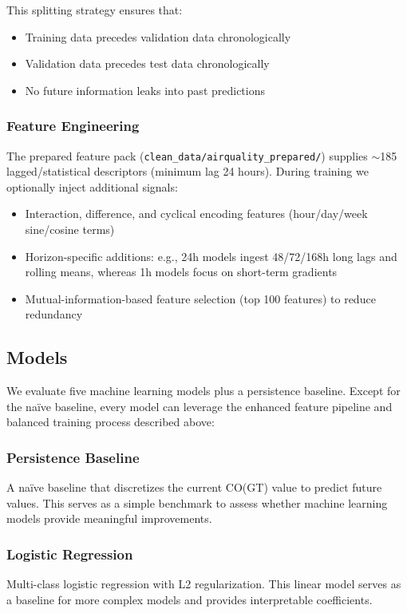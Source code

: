 \documentclass[12pt,a4paper]{article}
\begin{document}
This splitting strategy ensures that:
\begin{itemize}
    \item Training data precedes validation data chronologically
    \item Validation data precedes test data chronologically
    \item No future information leaks into past predictions
\end{itemize}

\subsubsection{Feature Engineering}
The prepared feature pack (\texttt{clean\_data/airquality\_prepared/}) supplies $\sim$185 lagged/statistical descriptors (minimum lag 24 hours). During training we optionally inject additional signals:
\begin{itemize}
    \item Interaction, difference, and cyclical encoding features (hour/day/week sine/cosine terms)
    \item Horizon-specific additions: e.g., 24h models ingest 48/72/168h long lags and rolling means, whereas 1h models focus on short-term gradients
    \item Mutual-information-based feature selection (top 100 features) to reduce redundancy
\end{itemize}

\subsection{Models}

We evaluate five machine learning models plus a persistence baseline. Except for the naïve baseline, every model can leverage the enhanced feature pipeline and balanced training process described above:

\subsubsection{Persistence Baseline}
A naïve baseline that discretizes the current CO(GT) value to predict future values. This serves as a simple benchmark to assess whether machine learning models provide meaningful improvements.

\subsubsection{Logistic Regression}
Multi-class logistic regression with L2 regularization. This linear model serves as a baseline for more complex models and provides interpretable coefficients.
\end{document}
